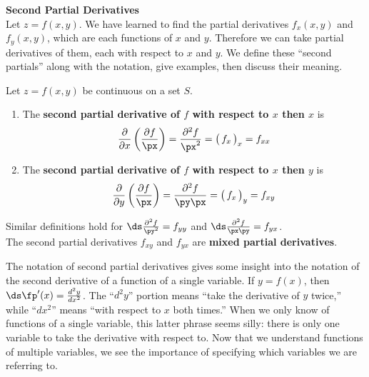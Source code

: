 \noindent\textbf{\large Second Partial Derivatives}\\

Let $z=f(x,y)$. We have learned to find the partial derivatives $f_x(x,y)$ and $f_y(x,y)$, which are each functions of $x$ and $y$. Therefore we can take partial derivatives of them, each with respect to $x$ and $y$. We define these ``second partials'' along with the notation, give examples, then discuss their meaning.

{Let $z=f(x,y)$ be continuous on a set $S$.
\begin{enumerate}
	\item The \textbf{second partial derivative of $f$ with respect to $x$ then $x$} is $$\frac{\partial}{\partial x}\left(\frac{\partial f}{\px}\right) = \frac{\partial^2 f}{\px^2} = \big(\,f_x\,\big)_x = f_{xx}$$

\item The \textbf{second partial derivative of $f$ with respect to $x$ then $y$} is $$\frac{\partial}{\partial y}\left(\frac{\partial f}{\px}\right) = \frac{\partial^2f}{\py\px} = \big(\,f_x\,\big)_y = f_{xy}$$

%

\end{enumerate}

Similar definitions hold for $\ds \frac{\partial^2f}{\py^2} = f_{yy}$ and $\ds \frac{\partial^2f}{\px\py} = f_{yx}$. \\

The second partial derivatives $f_{xy}$ and $f_{yx}$ are \textbf{mixed partial derivatives}.
}

The notation of second partial derivatives gives some insight into the notation of the second derivative of a function of a single variable. If $y=f(x)$, then $\ds \fp'(x) = \frac{d^2 y}{dx^2}$. The ``$d^2y$'' portion means ``take the derivative of $y$ twice,'' while ``$dx^2$'' means ``with respect to $x$ both times.'' When we only know of functions of a single variable, this latter phrase seems silly: there is only one variable to take the derivative with respect to. Now that we understand functions of multiple variables, we see the importance of specifying which variables we are referring to.\\

